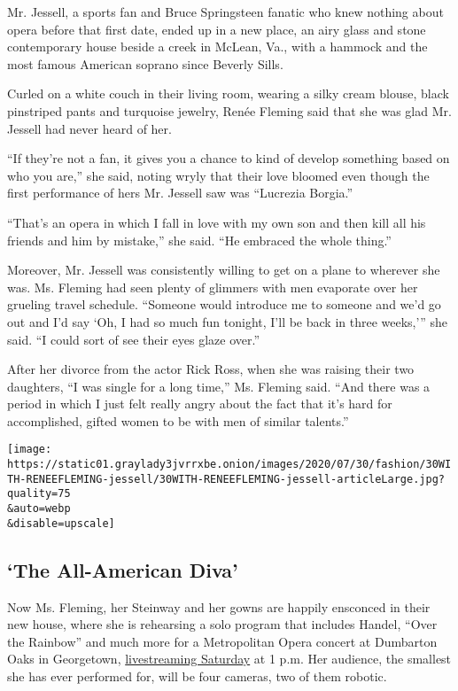 Mr. Jessell, a sports fan and Bruce Springsteen fanatic who knew nothing
about opera before that first date, ended up in a new place, an airy
glass and stone contemporary house beside a creek in McLean, Va., with a
hammock and the most famous American soprano since Beverly Sills.

Curled on a white couch in their living room, wearing a silky cream
blouse, black pinstriped pants and turquoise jewelry, Renée Fleming said
that she was glad Mr. Jessell had never heard of her.

``If they're not a fan, it gives you a chance to kind of develop
something based on who you are,'' she said, noting wryly that their love
bloomed even though the first performance of hers Mr. Jessell saw was
``Lucrezia Borgia.''

``That's an opera in which I fall in love with my own son and then kill
all his friends and him by mistake,'' she said. ``He embraced the whole
thing.''

Moreover, Mr. Jessell was consistently willing to get on a plane to
wherever she was. Ms. Fleming had seen plenty of glimmers with men
evaporate over her grueling travel schedule. ``Someone would introduce
me to someone and we'd go out and I'd say `Oh, I had so much fun
tonight, I'll be back in three weeks,''' she said. ``I could sort of see
their eyes glaze over.''

After her divorce from the actor Rick Ross, when she was raising their
two daughters, ``I was single for a long time,'' Ms. Fleming said. ``And
there was a period in which I just felt really angry about the fact that
it's hard for accomplished, gifted women to be with men of similar
talents.''

\texttt{[image: https://static01.graylady3jvrrxbe.onion/images/2020/07/30/fashion/30WITH-RENEEFLEMING-jessell/30WITH-RENEEFLEMING-jessell-articleLarge.jpg?quality=75\\\&auto=webp\\\&disable=upscale]}

\hypertarget{the-all-american-diva}{%
\subsection{`The All-American Diva'}\label{the-all-american-diva}}

Now Ms. Fleming, her Steinway and her gowns are happily ensconced in
their new house, where she is rehearsing a solo program that includes
Handel, ``Over the Rainbow'' and much more for a Metropolitan Opera
concert at Dumbarton Oaks in Georgetown,
\href{https://www.metopera.org/discover/video/?videoName=renee-fleming-live-in-concert\&videoId=6174507070001}{livestreaming
Saturday} at 1 p.m. Her audience, the smallest she has ever performed
for, will be four cameras, two of them robotic.

